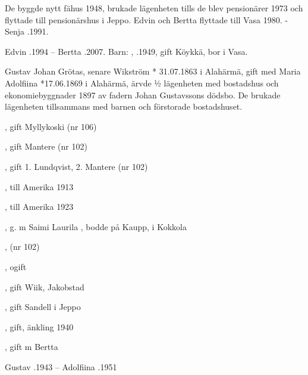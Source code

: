 De byggde nytt fähus 1948, brukade lägenheten tills de blev pensionärer 1973 och flyttade till pensionärshus i Jeppo.  Edvin och Bertta flyttade till Vasa 1980. - Senja .1991.

Edvin .1994  --  Bertta .2007.
Barn: , .1949, gift Köykkä, bor i Vasa.


Gustav Johan Grötas, senare Wikström * 31.07.1863 i Alahärmä, gift med Maria Adolfiina *17.06.1869 i Alahärmä, ärvde ½ lägenheten med bostadshus och ekonomiebyggnader 1897 av fadern Johan Gustavssons dödsbo. De brukade lägenheten  tillsammans med barnen och förstorade bostadshuset.
\begin{jhchildren}
  \item {}, gift Myllykoski (nr 106)
  \item {}, gift Mantere (nr 102)
  \item {}, gift 1. Lundqvist, 2. Mantere (nr 102)
  \item {}, till Amerika 1913
  \item {}, till Amerika 1923
  \item {}, g. m Saimi Laurila , bodde på Kaupp,  i Kokkola
  \item {}
  \item {}, (nr 102)
  \item {}, ogift
  \item {}, gift Wiik, Jakobstad
  \item {}
  \item {}, gift Sandell i Jeppo
  \item {}, gift, änkling 1940
  \item {}, gift m Bertta
\end{jhchildren}
Gustav .1943  --  Adolfiina .1951


